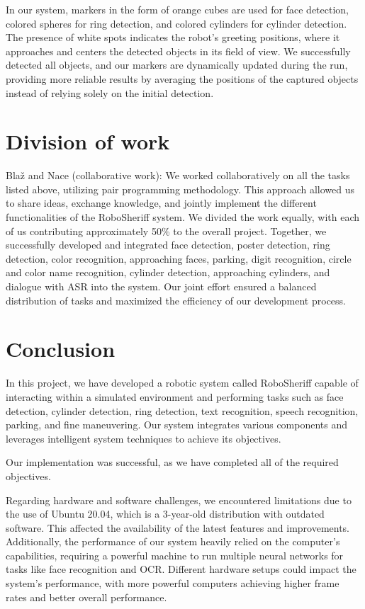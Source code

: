 \documentclass{article}
\begin{document}
In our system, markers in the form of orange cubes are used for face detection, colored spheres for ring detection, and colored cylinders for cylinder detection. The presence of white spots indicates the robot's greeting positions, where it approaches and centers the detected objects in its field of view. We successfully detected all objects, and our markers are dynamically updated during the run, providing more reliable results by averaging the positions of the captured objects instead of relying solely on the initial detection.

\section{Division of work}

Blaž and Nace (collaborative work):
We worked collaboratively on all the tasks listed above, utilizing pair programming methodology. This approach allowed us to share ideas, exchange knowledge, and jointly implement the different functionalities of the RoboSheriff system. We divided the work equally, with each of us contributing approximately 50\% to the overall project. Together, we successfully developed and integrated face detection, poster detection, ring detection, color recognition, approaching faces, parking, digit recognition, circle and color name recognition, cylinder detection, approaching cylinders, and dialogue with ASR into the system. Our joint effort ensured a balanced distribution of tasks and maximized the efficiency of our development process.

\section{Conclusion}

In this project, we have developed a robotic system called RoboSheriff capable of interacting within a simulated environment and performing tasks such as face detection, cylinder detection, ring detection, text recognition, speech recognition, parking, and fine maneuvering. Our system integrates various components and leverages intelligent system techniques to achieve its objectives.

Our implementation was successful, as we have completed all of the required objectives.

Regarding hardware and software challenges, we encountered limitations due to the use of Ubuntu 20.04, which is a 3-year-old distribution with outdated software. This affected the availability of the latest features and improvements. Additionally, the performance of our system heavily relied on the computer's capabilities, requiring a powerful machine to run multiple neural networks for tasks like face recognition and OCR. Different hardware setups could impact the system's performance, with more powerful computers achieving higher frame rates and better overall performance.
\end{document}
